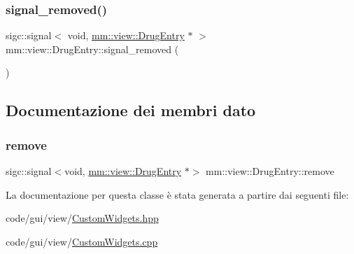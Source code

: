 \mbox{\label{classmm_1_1view_1_1_drug_entry_aa7a9f1fd2d7a48a803314fa2c9a86370}} 
\subsubsection{\texorpdfstring{signal\+\_\+removed()}{signal\_removed()}}
{\footnotesize\ttfamily sigc\+::signal$<$ void, \mbox{\hyperlink{classmm_1_1view_1_1_drug_entry}{mm\+::view\+::\+Drug\+Entry}} $\ast$ $>$ mm\+::view\+::\+Drug\+Entry\+::signal\+\_\+removed (\begin{DoxyParamCaption}{ }\end{DoxyParamCaption})}



\subsection{Documentazione dei membri dato}
\mbox{\label{classmm_1_1view_1_1_drug_entry_a34bee6e0f8a4722c4e41b333eac49f60}} 
\subsubsection{\texorpdfstring{remove}{remove}}
{\footnotesize\ttfamily sigc\+::signal$<$void, \mbox{\hyperlink{classmm_1_1view_1_1_drug_entry}{mm\+::view\+::\+Drug\+Entry}} $\ast$$>$ mm\+::view\+::\+Drug\+Entry\+::remove\hspace{0.3cm}{\ttfamily [protected]}}



La documentazione per questa classe è stata generata a partire dai seguenti file\+:\begin{DoxyCompactItemize}
\item 
code/gui/view/\mbox{\hyperlink{_custom_widgets_8hpp}{Custom\+Widgets.\+hpp}}\item 
code/gui/view/\mbox{\hyperlink{_custom_widgets_8cpp}{Custom\+Widgets.\+cpp}}\end{DoxyCompactItemize}
